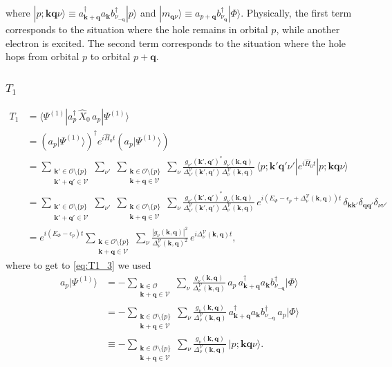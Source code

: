 where $|p;\bm k\bm q\nu\rangle\equiv a^\dagger_{\bm k+\bm q}a_{\bm k}b^\dagger_{\nu_{-\bm q}}|p\rangle$ and $|m_{\bm q\nu}\rangle\equiv a_{p+\bm q}b^\dagger_{\nu_{\bm q}}|\Phi\rangle$.
Physically, the first term corresponds to the situation where the hole remains in orbital $p$, while another electron is excited. The second term corresponds to the situation where the hole hops from orbital $p$ to orbital $p+\bm q$.
\subsubsection{$T_1$}
\begin{align}
T_1&=\langle\Psi^{(1)}|a_p^\dagger\,\hat X_0\,a_p|\Psi^{(1)}\rangle\\
&=\left(a_p|\Psi^{(1)}\rangle\right)^\dagger e^{i\hat H_0t}\left(a_p|\Psi^{(1)}\rangle\right)\\ \label{eq:T1_3}
&=\sum_{\substack{\bm k'\in\mathcal O\setminus\{p\}\\ \bm k'+\bm q'\in\mathcal V}}\sum_{\nu'}\;
\sum_{\substack{\bm k\in\mathcal O\setminus\{p\}\\ \bm k+\bm q\in\mathcal V}}\sum_\nu
\frac{g_{\nu'}(\bm k',\bm q')^*\,g_\nu(\bm k,\bm q)}{\Delta^{\mathcal V}_{\nu'}(\bm k',\bm q')\,\Delta^{\mathcal V}_\nu(\bm k,\bm q)}\,
\langle p;\bm k'\bm q'\nu'|e^{i\hat H_0t}|p;\bm k\bm q\nu\rangle\\
&=\sum_{\substack{\bm k'\in\mathcal O\setminus\{p\}\\ \bm k'+\bm q'\in\mathcal V}}\sum_{\nu'}\;
\sum_{\substack{\bm k\in\mathcal O\setminus\{p\}\\ \bm k+\bm q\in\mathcal V}}\sum_\nu
\frac{g_{\nu'}(\bm k',\bm q')^*\,g_\nu(\bm k,\bm q)}{\Delta^{\mathcal V}_{\nu'}(\bm k',\bm q')\,\Delta^{\mathcal V}_\nu(\bm k,\bm q)}\,
e^{i\left(E_\Phi-\epsilon_p+\Delta^{\mathcal V}_\nu(\bm k,\bm q)\right)t}\,
\delta_{\bm k\bm k'}\delta_{\bm q\bm q'}\delta_{\nu\nu'}\\
&=e^{i(E_\Phi-\epsilon_p)t}\sum_{\substack{\bm k\in\mathcal O\setminus\{p\}\\ \bm k+\bm q\in\mathcal V}}\sum_\nu
\frac{|g_\nu(\bm k,\bm q)|^2}{\Delta^{\mathcal V}_\nu(\bm k,\bm q)^2}\,e^{i\Delta^{\mathcal V}_\nu(\bm k,\bm q)t},
\end{align}
where to get to \ref{eq:T1_3} we used
\begin{align}
a_p|\Psi^{(1)}\rangle
&=-\sum_{\substack{\bm k\in\mathcal O\\ \bm k+\bm q\in\mathcal V}}\sum_\nu\frac{g_\nu(\bm k,\bm q)}{\Delta^{\mathcal V}_\nu(\bm k,\bm q)}\,a_p\,a^\dagger_{\bm k+\bm q}a_{\bm k}b^\dagger_{\nu_{-\bm q}}|\Phi\rangle \\
&=-\sum_{\substack{\bm k\in\mathcal O\setminus\{p\}\\ \bm k+\bm q\in\mathcal V}}\sum_\nu\frac{g_\nu(\bm k,\bm q)}{\Delta^{\mathcal V}_\nu(\bm k,\bm q)}\,a^\dagger_{\bm k+\bm q}a_{\bm k}b^\dagger_{\nu_{-\bm q}}\,a_p|\Phi\rangle\\
&\equiv -\sum_{\substack{\bm k\in\mathcal O\setminus\{p\}\\ \bm k+\bm q\in\mathcal V}}\sum_\nu\frac{g_\nu(\bm k,\bm q)}{\Delta^{\mathcal V}_\nu(\bm k,\bm q)}\,|p;\bm k\bm q\nu\rangle .
\label{eq:apPsi1}
\end{align}
